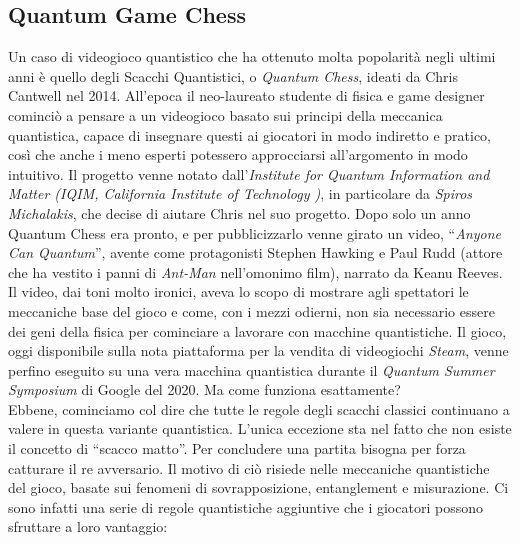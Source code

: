 \documentclass{book}
\theoremstyle{definition}
\theoremstyle{definition}
\theoremstyle{definition}
\theoremstyle{plain}
\theoremstyle{plain}
\theoremstyle{plain}
\theoremstyle{plain}
\begin{document}
\subsection{Quantum Game Chess}
Un caso di videogioco quantistico che ha ottenuto molta popolarità negli ultimi anni è quello degli Scacchi Quantistici, o \emph{Quantum Chess}\cite{quantum_chess}, ideati da Chris Cantwell nel 2014. All'epoca il neo-laureato studente di fisica e game designer cominciò a pensare a un videogioco basato sui principi della meccanica quantistica, capace di insegnare questi ai giocatori in modo indiretto e pratico, così che anche i meno esperti potessero approcciarsi all'argomento in modo intuitivo. Il progetto venne notato dall'\emph{Institute for Quantum Information and Matter (IQIM, California Institute of Technology%
)}, in particolare da \emph{Spiros Michalakis}, che decise di aiutare Chris nel suo progetto. Dopo solo un anno Quantum Chess era pronto, e per pubblicizzarlo venne girato un video, ``\emph{Anyone Can Quantum}'', avente come protagonisti Stephen Hawking e Paul Rudd (attore che ha vestito i panni di \emph{Ant-Man} nell'omonimo film), narrato da Keanu Reeves\cite{paul_rudd_chess}. Il video, dai toni molto ironici, aveva lo scopo di mostrare agli spettatori le meccaniche base del gioco e come, con i mezzi odierni, non sia necessario essere dei geni della fisica per cominciare a lavorare con macchine quantistiche. Il gioco, oggi disponibile sulla nota piattaforma per la vendita di videogiochi \emph{Steam}, venne perfino eseguito su una vera macchina quantistica durante il \emph{Quantum Summer Symposium} di Google del 2020\cite{quantum_chess_demonstration}. Ma come funziona esattamente?\\
Ebbene, cominciamo col dire che tutte le regole degli scacchi classici continuano a valere in questa variante quantistica. L'unica eccezione sta nel fatto che non esiste il concetto di ``scacco matto''. Per concludere una partita bisogna per forza catturare il re avversario. Il motivo di ciò risiede nelle meccaniche quantistiche del gioco, basate sui fenomeni di sovrapposizione, entanglement e misurazione. Ci sono infatti una serie di regole quantistiche aggiuntive che i giocatori possono sfruttare a loro vantaggio:
\end{document}
